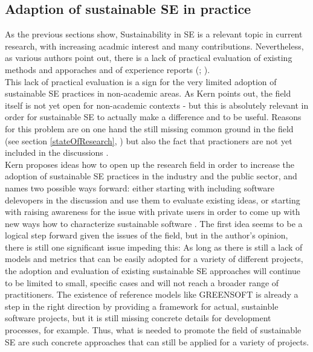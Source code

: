 \documentclass[oribibl]{llncs}
\begin{document}
\subsection{Adaption of sustainable SE in practice}%
As the previous sections show, Sustainability in SE is a relevant topic in current research, with increasing acadmic interest and many contributions. Nevertheless, as various authors point out, there is a lack of practical evaluation of existing methods and apporaches and of experience reports (\cite{penzenstadler_sustainability_2012}; \cite{penzenstadler_systematic_2014}).\\ %
This lack of practical evaluation is a sign for the very limited adoption of sustainable SE practices in non-academic areas. As Kern \cite{kern_how_2016} points out, the field itself is not yet open for non-academic contexts - but this is absolutely relevant in order for sustainable SE to actually make a difference and to be useful. Reasons for this problem are on one hand the still missing common ground in the field (see section \ref{stateOfResearch}, %
\cite{kern_how_2016}) but also the fact that practioners are not yet included in the discussions \cite{kern_how_2016}.\\
Kern proposes ideas how to open up the research field in order to increase the adoption of sustainable SE practices in the industry and the public sector, and names two possible ways forward: either starting with including software delevopers in the discussion and use them to evaluate existing ideas, or starting with raising awareness for the issue with private users in order to come up with new ways how to characterize sustainable software \cite{kern_how_2016}. The first idea seems to be a logical step forward given the issues of the field, but in the author's opinion, there is still one significant issue impeding this: As long as there is still a lack of models and metrics that can be easily adopted for a variety of different projects, the adoption and evaluation of existing sustainable SE approaches will continue to be limited to small, specific cases and will not reach a broader range of practitioners. The existence of reference models like GREENSOFT is already a step in the right direction by providing a framework for actual, sustainble software projects, but it is still missing concrete details for development processes, for example. Thus, what is needed to promote the field of sustainable SE are such concrete approaches that can still be applied for a variety of projects. %
\end{document}
